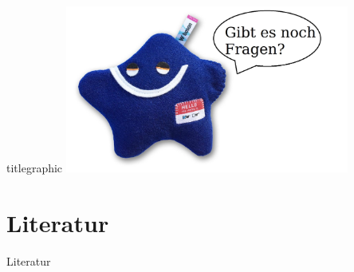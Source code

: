 \documentclass[aspectratio=1610, 9pt]{beamer}
\begin{document}
\begin{frame}
\begin{beamercolorbox}[center, wd=\textwidth]{titlegraphic}
\includegraphics[width=0.7\textwidth]{images/particle_zoo.jpg}
\end{beamercolorbox}%
\end{frame}


%

\section{Literatur}
\begin{frame}[allowframebreaks]{Literatur}
  \printbibliography
\end{frame}

\nocite{comparison}
\nocite{tevatron}
\nocite{particle_zoo}
\end{document}
